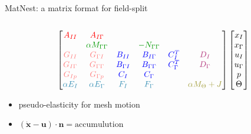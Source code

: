 \newcommand{\colorA}[1]{{\color{red} #1}}
\newcommand{\colorB}[1]{{\color{green!60!black} #1}}
\newcommand{\colorC}[1]{{\color{blue} #1}}
\newcommand{\colorD}[1]{{\color{magenta!70!black} #1}}
\newcommand{\colorE}[1]{{\color{cyan!70!black} #1}}
\newcommand{\colorF}[1]{{\color{yellow!60!black} #1}}
\newcommand{\colorG}[1]{{\color{red!50!white} #1}}
\begin{frame}{MatNest: a matrix format for field-split}
  \begin{columns}
    \begin{column}{0.65\textwidth}\small
      \begin{equation*}
        \begin{bmatrix}
          \colorA{A_{II}} & \colorA{A_{I\Gamma}}             &                       &                             &                     &   \\
          & \colorB{\alpha M_{\Gamma\Gamma}} &                       & \colorB{- N_{\Gamma\Gamma}} &                       &  \\
          \colorG{G_{II}}      & \colorG{G_{\Gamma I}} & \colorC{B_{II}}       & \colorC{B_{I\Gamma}}        & \colorC{C_{I}^T}    & \colorD{D_I} \\
          \colorG{G_{I\Gamma}} &        \colorG{G_{\Gamma\Gamma}}                          & \colorC{B_{\Gamma I}} & \colorC{B_{\Gamma\Gamma}}   & \colorC{C_{\Gamma}^T} & \colorD{D_\Gamma} \\
          \colorG{G_{Ip}}        &  \colorG{G_{\Gamma p}}                                & \colorC{C_{I}}        & \colorC{C_{\Gamma}}         &                   & \\
          \colorE{\alpha E_I}    & \colorE{\alpha E_\Gamma} & \colorE{F_I} & \colorE{F_\Gamma} & & \colorF{\alpha M_\Theta + J}
        \end{bmatrix}
        \begin{bmatrix}
          x_I \\ x_\Gamma \\ u_I \\ u_\Gamma \\ p \\ \Theta
        \end{bmatrix}
      \end{equation*}
      \begin{itemize}
      \item \colorA{pseudo-elasticity for mesh motion}
      \item \colorB{$(\dot{\bm x} - \bm u)\cdot \bm n = \text{accumulution}$}

\end{itemize}
\end{column}
\end{columns}
\end{frame}
